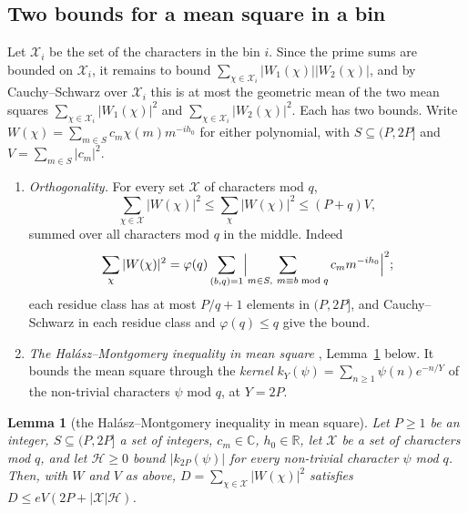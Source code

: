 \documentclass[11pt]{article}
\newtheorem{lemma}[theorem]{Lemma}
\theoremstyle{definition}
\begin{document}
\subsection{Two bounds for a mean square in a bin}\label{sec:two-bounds}

Let $\mathcal X_i$ be the set of the characters in the bin $i$. Since the prime sums are bounded on $\mathcal X_i$, it
remains to bound $\sum_{\chi \in \mathcal X_i} |W_1(\chi)||W_2(\chi)|$, and by Cauchy--Schwarz over $\mathcal X_i$ this
is at most the geometric mean of the two mean squares $\sum_{\chi \in \mathcal X_i} |W_1(\chi)|^2$ and $\sum_{\chi \in
\mathcal X_i} |W_2(\chi)|^2$. Each has two bounds. Write $W(\chi) = \sum_{m \in S} c_m \chi(m) m^{-ih_0}$ for either
polynomial, with $S \subseteq (P, 2P]$ and $V = \sum_{m \in S} |c_m|^2$.
\begin{enumerate}
\item \emph{Orthogonality.} For every set $\mathcal X$ of characters mod $q$,
  \[
    \sum_{\chi \in \mathcal X} |W(\chi)|^2 \le \sum_\chi |W(\chi)|^2 \le (P + q) V,
  \]
  summed over all characters mod $q$ in the middle. Indeed
  \[
    \sum_\chi |W(\chi)|^2
    = \varphi(q) \sum_{(b, q) = 1} \Bigl|\sum_{m \in S,\ m \equiv b \bmod q} c_m m^{-ih_0}\Bigr|^2;
  \]
  each residue class has at most $P/q + 1$ elements in $(P, 2P]$, and Cauchy--Schwarz in each residue class and
  $\varphi(q) \le q$ give the bound.
\item \emph{The Hal\'asz--Montgomery inequality in mean square} \cite{halasz, montgomery69}, Lemma~\ref{lem:hm-sq}
  below. It bounds the mean square through the \emph{kernel} $k_Y(\psi) = \sum_{n \ge 1} \psi(n) e^{-n/Y}$ of the
  non-trivial characters $\psi$ mod $q$, at $Y = 2P$.
\end{enumerate}

\begin{lemma}[the Hal\'asz--Montgomery inequality in mean square]\label{lem:hm-sq}
Let $P \ge 1$ be an integer, $S \subseteq (P, 2P]$ a set of integers, $c_m \in \mathbb C$, $h_0 \in \mathbb R$, let
$\mathcal X$ be a set of
characters mod $q$, and let $\mathcal H \ge 0$ bound $|k_{2P}(\psi)|$ for every non-trivial character $\psi$ mod $q$.
Then, with $W$ and $V$ as above, $D = \sum_{\chi \in \mathcal X} |W(\chi)|^2$ satisfies $D \le e V (2P + |\mathcal X|
\mathcal H)$.
\end{lemma}
\end{document}
